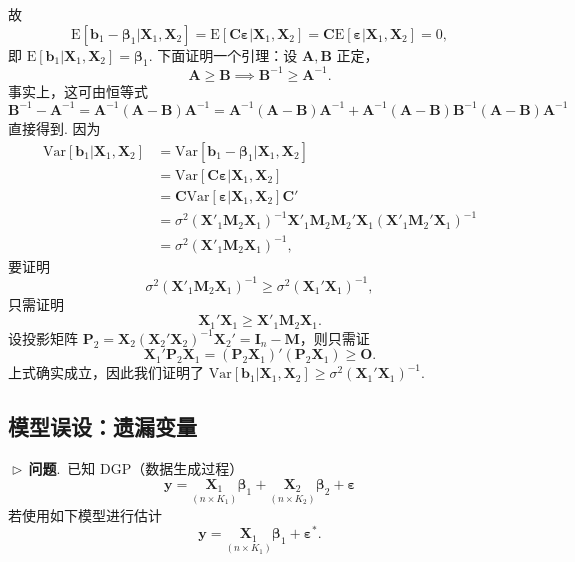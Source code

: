 \documentclass{article}
\newcommand{\E}{\mathrm{E}}
\newcommand{\Var}{\mathrm{Var}}
\newcommand{\y}{\mathbf{y}}
\newcommand{\X}{\mathbf{X}}
\newcommand{\M}{\mathbf{M}}
\newcommand{\0}{\mathbf{0}}
\newcommand{\vbe}{\bm{\beta}}
\newcommand{\vep}{\bm{\varepsilon}}
\newcommand{\vb}{\mathbf{b}}
\newcommand{\pro}{\noindent$\vartriangleright\,$\textbf{问题}.\ }
\begin{document}
故
\[
\E[\vb_1-\vbe_1|\X_1,\X_2]=\E[\mathbf{C}\vep|\X_1,\X_2]=\mathbf{C}\E[\vep|\X_1,\X_2]=0,
\]
即 $\E[\vb_1|\X_1,\X_2]=\vbe_1$. 下面证明一个引理：设 $\mathbf{A},\mathbf{B}$ 正定，
\[
\mathbf{A}\ge\mathbf{B}\implies\mathbf{B}^{-1}\ge\mathbf{A}^{-1}.
\]
事实上，这可由恒等式
\[
\mathbf{B}^{-1}-\mathbf{A}^{-1} = \mathbf{A}^{-1}(\mathbf{A}-\mathbf{B})\mathbf{A}^{-1}
=\mathbf{A}^{-1}(\mathbf{A}-\mathbf{B})\mathbf{A}^{-1} + \mathbf{A}^{-1}(\mathbf{A}-\mathbf{B})\mathbf{B}^{-1}(\mathbf{A}-\mathbf{B})\mathbf{A}^{-1}
\]
直接得到. 因为
\begin{align*}
\Var[\vb_1|\X_1,\X_2]&=\Var[\vb_1-\vbe_1|\X_1,\X_2]\\
&=\Var[\mathbf{C}\vep|\X_1,\X_2]\\
&=\mathbf{C}\Var[\vep|\X_1,\X_2]\mathbf{C}'\\
&=\sigma^2(\X'_1\M_2\X_1)^{-1}\X'_1\M_2\M_2'\X_1(\X'_1\M_2'\X_1)^{-1}\\
&=\sigma^2(\X'_1\M_2\X_1)^{-1},
\end{align*}
要证明
\[
\sigma^2(\X'_1\M_2\X_1)^{-1}\ge\sigma^2(\X_1'\X_1)^{-1},
\]
只需证明
\[
\X_1'\X_1\ge\X'_1\M_2\X_1.
\]
设投影矩阵 $\mathbf{P}_2=\X_2(\X_2'\X_2)^{-1}\X_2'=\mathbf{I}_n-\M$，则只需证
\[
\X_1'\mathbf{P}_2\X_1=(\mathbf{P}_2\X_1)'(\mathbf{P}_2\X_1)\ge\mathbf{O}.
\]
上式确实成立，因此我们证明了 $\Var[\vb_1|\X_1,\X_2]\ge\sigma^2(\X_1'\X_1)^{-1}$.

\subsection{模型误设：遗漏变量}
\pro 已知 DGP（数据生成过程）
\[
\y = \underset{(n\times K_1)}{\X_1} \vbe_1 +\underset{(n\times K_2)}{\X_2} \vbe_2+\vep
\]
若使用如下模型进行估计
\[
\y = \underset{(n\times K_1)}{\X_1}\vbe_1 +\vep^*.
\]
\end{document}

